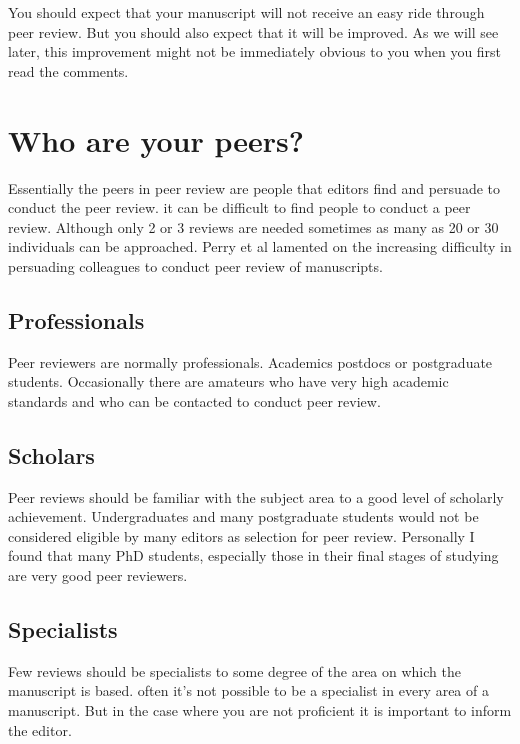 \documentclass[
]{krantz}
\begin{document}
You should expect that your manuscript will not receive an easy ride through peer review. But you should also expect that it will be improved. As we will see later, this improvement might not be immediately obvious to you when you first read the comments.

\hypertarget{who-are-your-peers}{%
\section{Who are your peers?}\label{who-are-your-peers}}

Essentially the peers in peer review are people that editors find and persuade to conduct the peer review. it can be difficult to find people to conduct a peer review. Although only 2 or 3 reviews are needed sometimes as many as 20 or 30 individuals can be approached. Perry et al \citeyearpar{perry2012peer} lamented on the increasing difficulty in persuading colleagues to conduct peer review of manuscripts.

\hypertarget{professionals}{%
\subsection{Professionals}\label{professionals}}

Peer reviewers are normally professionals. Academics postdocs or postgraduate students. Occasionally there are amateurs who have very high academic standards and who can be contacted to conduct peer review.

\hypertarget{scholars}{%
\subsection{Scholars}\label{scholars}}

Peer reviews should be familiar with the subject area to a good level of scholarly achievement. Undergraduates and many postgraduate students would not be considered eligible by many editors as selection for peer review. Personally I found that many PhD students, especially those in their final stages of studying are very good peer reviewers.

\hypertarget{specialists}{%
\subsection{Specialists}\label{specialists}}

Few reviews should be specialists to some degree of the area on which the manuscript is based. often it's not possible to be a specialist in every area of a manuscript. But in the case where you are not proficient it is important to inform the editor.
\end{document}
